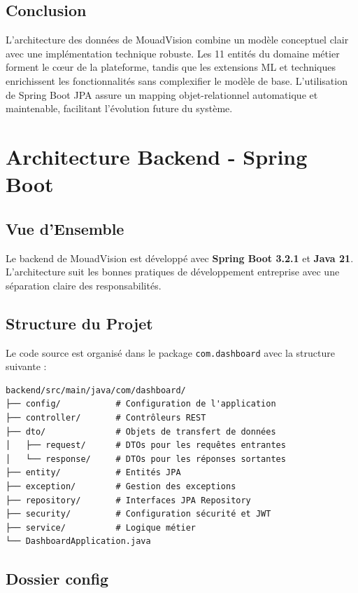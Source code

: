 \documentclass[12pt,a4paper]{report}
\begin{document}
\section{Conclusion}

L'architecture des données de MouadVision combine un modèle conceptuel clair avec une implémentation technique robuste. Les 11 entités du domaine métier forment le cœur de la plateforme, tandis que les extensions ML et techniques enrichissent les fonctionnalités sans complexifier le modèle de base. L'utilisation de Spring Boot JPA assure un mapping objet-relationnel automatique et maintenable, facilitant l'évolution future du système.

\chapter{Architecture Backend - Spring Boot}

\section{Vue d'Ensemble}

Le backend de MouadVision est développé avec \textbf{Spring Boot 3.2.1} et \textbf{Java 21}. L'architecture suit les bonnes pratiques de développement entreprise avec une séparation claire des responsabilités.

\section{Structure du Projet}

Le code source est organisé dans le package \texttt{com.dashboard} avec la structure suivante :

\begin{verbatim}
backend/src/main/java/com/dashboard/
├── config/           # Configuration de l'application
├── controller/       # Contrôleurs REST
├── dto/              # Objets de transfert de données
│   ├── request/      # DTOs pour les requêtes entrantes
│   └── response/     # DTOs pour les réponses sortantes
├── entity/           # Entités JPA
├── exception/        # Gestion des exceptions
├── repository/       # Interfaces JPA Repository
├── security/         # Configuration sécurité et JWT
├── service/          # Logique métier
└── DashboardApplication.java
\end{verbatim}

\section{Dossier config}
\end{document}
